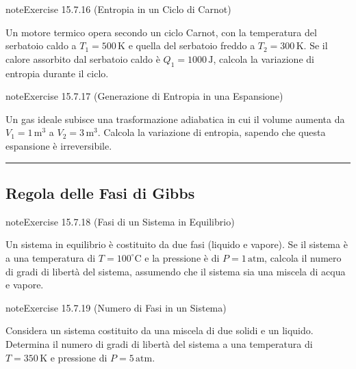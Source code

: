\documentclass[letterpaper,10pt,italian]{jupyterBook}
\begin{document}
\begin{sphinxadmonition}{note}{Exercise 15.7.16 (Entropia in un Ciclo di Carnot)}



\sphinxAtStartPar
Un motore termico opera secondo un ciclo Carnot, con la temperatura del serbatoio caldo a \(T_1 = 500 \, \text{K}\) e quella del serbatoio freddo a \(T_2 = 300 \, \text{K}\). Se il calore assorbito dal serbatoio caldo è \(Q_1 = 1000 \, \text{J}\), calcola la variazione di entropia durante il ciclo.
\end{sphinxadmonition}
 \label{exercise:ch/thermodynamics/principles-problems-exercise-16}

\begin{sphinxadmonition}{note}{Exercise 15.7.17 (Generazione di Entropia in una Espansione)}



\sphinxAtStartPar
Un gas ideale subisce una trasformazione adiabatica in cui il volume aumenta da \(V_1 = 1 \, \text{m}^3\) a \(V_2 = 3 \, \text{m}^3\). Calcola la variazione di entropia, sapendo che questa espansione è irreversibile.
\end{sphinxadmonition}


\bigskip\hrule\bigskip



\subsection{Regola delle Fasi di Gibbs}
\label{\detokenize{ch/thermodynamics/principles-problems:regola-delle-fasi-di-gibbs}} \label{exercise:ch/thermodynamics/principles-problems-exercise-17}

\begin{sphinxadmonition}{note}{Exercise 15.7.18 (Fasi di un Sistema in Equilibrio)}



\sphinxAtStartPar
Un sistema in equilibrio è costituito da due fasi (liquido e vapore). Se il sistema è a una temperatura di \(T = 100^\circ \text{C}\) e la pressione è di \(P = 1 \, \text{atm}\), calcola il numero di gradi di libertà del sistema, assumendo che il sistema sia una miscela di acqua e vapore.
\end{sphinxadmonition}
 \label{exercise:ch/thermodynamics/principles-problems-exercise-18}

\begin{sphinxadmonition}{note}{Exercise 15.7.19 (Numero di Fasi in un Sistema)}



\sphinxAtStartPar
Considera un sistema costituito da una miscela di due solidi e un liquido. Determina il numero di gradi di libertà del sistema a una temperatura di \(T = 350 \, \text{K}\) e pressione di \(P = 5 \, \text{atm}\).
\end{sphinxadmonition}
 \label{exercise:ch/thermodynamics/principles-problems-exercise-19}
\end{document}
